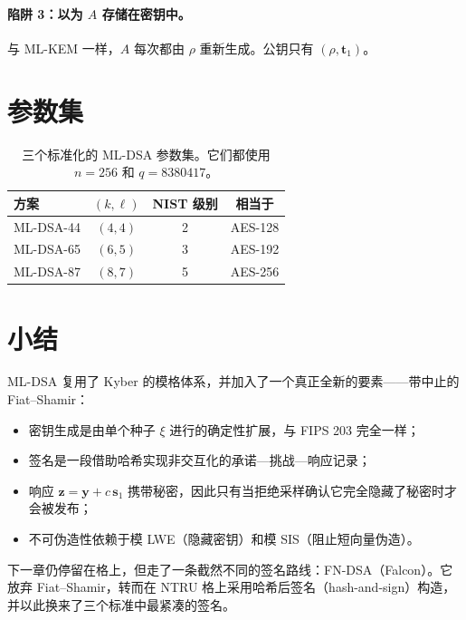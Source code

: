 \paragraph{陷阱 3：以为 $A$ 存储在密钥中。}
与 ML-KEM 一样，$A$ 每次都由 $\rho$ 重新生成。公钥只有 $(\rho,\mathbf{t}_1)$。

\section{参数集}

\begin{table}[H]
\centering
\begin{tabular}{lccc}
\toprule
方案 & $(k,\ell)$ & NIST 级别 & 相当于 \\
\midrule
ML-DSA-44 & $(4,4)$ & 2 & AES-128 \\
ML-DSA-65 & $(6,5)$ & 3 & AES-192 \\
ML-DSA-87 & $(8,7)$ & 5 & AES-256 \\
\bottomrule
\end{tabular}
\caption{三个标准化的 ML-DSA 参数集。它们都使用 $n=256$ 和 $q=8380417$。}
\end{table}

\section{小结}

ML-DSA 复用了 Kyber 的模格体系，并加入了一个真正全新的要素——带中止的 Fiat--Shamir：

\begin{itemize}
  \item 密钥生成是由单个种子 $\xi$ 进行的确定性扩展，与 FIPS 203 完全一样；
  \item 签名是一段借助哈希实现非交互化的承诺—挑战—响应记录；
  \item 响应 $\mathbf{z}=\mathbf{y}+c\,\mathbf{s}_1$ 携带秘密，因此只有当拒绝采样确认它完全隐藏了秘密时才会被发布；
  \item 不可伪造性依赖于模 LWE（隐藏密钥）和模 SIS（阻止短向量伪造）。
\end{itemize}

下一章仍停留在格上，但走了一条截然不同的签名路线：FN-DSA（Falcon）。它放弃 Fiat--Shamir，转而在 NTRU 格上采用哈希后签名（hash-and-sign）构造，并以此换来了三个标准中最紧凑的签名。

\printbibliography[heading=chapterrefs]
